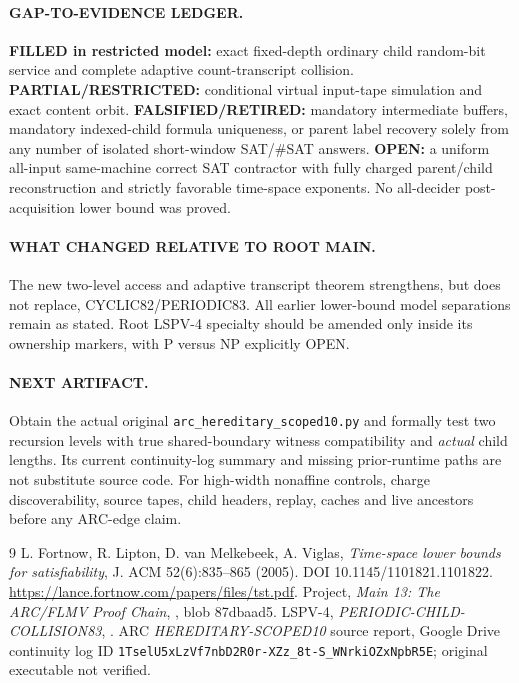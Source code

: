 \documentclass[11pt]{article}
\begin{document}
\paragraph{GAP-TO-EVIDENCE LEDGER.}
\textbf{FILLED in restricted model:} exact fixed-depth ordinary child random-bit service and complete adaptive count-transcript collision. \textbf{PARTIAL/RESTRICTED:} conditional virtual input-tape simulation and exact content orbit. \textbf{FALSIFIED/RETIRED:} mandatory intermediate buffers, mandatory indexed-child formula uniqueness, or parent label recovery solely from any number of isolated short-window SAT/\(\#\)SAT answers. \textbf{OPEN:} a uniform all-input same-machine correct SAT contractor with fully charged parent/child reconstruction and strictly favorable time-space exponents. No all-decider post-acquisition lower bound was proved.

\paragraph{WHAT CHANGED RELATIVE TO ROOT MAIN.}
The new two-level access and adaptive transcript theorem strengthens, but does not replace, CYCLIC82/PERIODIC83. All earlier lower-bound model separations remain as stated. Root LSPV-4 specialty should be amended only inside its ownership markers, with P versus NP explicitly OPEN.

\paragraph{NEXT ARTIFACT.}
Obtain the actual original \texttt{arc\_hereditary\_scoped10.py} and formally test two recursion levels with true shared-boundary witness compatibility and \emph{actual} child lengths. Its current continuity-log summary and missing prior-runtime paths are not substitute source code. For high-width nonaffine controls, charge discoverability, source tapes, child headers, replay, caches and live ancestors before any ARC-edge claim.

\begin{thebibliography}{9}
 L. Fortnow, R. Lipton, D. van Melkebeek, A. Viglas, \emph{Time-space lower bounds for satisfiability}, J. ACM 52(6):835--865 (2005). DOI 10.1145/1101821.1101822. \url{https://lance.fortnow.com/papers/files/tst.pdf}.
 Project, \emph{Main 13: The ARC/FLMV Proof Chain}, , blob 87dbaad5.
 LSPV-4, \emph{PERIODIC-CHILD-COLLISION83}, .
 ARC \emph{HEREDITARY-SCOPED10} source report, Google Drive continuity log ID \texttt{1TselU5xLzVf7nbD2R0r-XZz_8t-S_WNrkiOZxNpbR5E}; original executable not verified.
\end{thebibliography}
\end{document}
